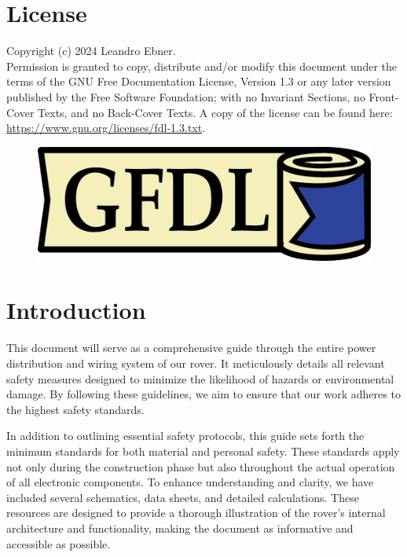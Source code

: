 \section{License}

    Copyright (c)  2024 Leandro Ebner. \\
    Permission is granted to copy, distribute and/or modify this document under the terms of the GNU Free Documentation License, Version 1.3 or any later version published by the Free Software Foundation; with no Invariant Sections, no Front-Cover Texts, and no Back-Cover Texts. A copy of the license can be found here:
    \href{https://www.gnu.org/licenses/fdl-1.3.txt}{https://www.gnu.org/licenses/fdl-1.3.txt}.

    \begin{figure}[h!]
    \includegraphics{contents/figures/gfdl-logo.png}
    \end{figure}
    
\section{Introduction}

    This document will serve as a comprehensive guide through the entire power distribution and wiring system of our rover. It meticulously details all relevant safety measures designed to minimize the likelihood of hazards or environmental damage. By following these guidelines, we aim to ensure that our work adheres to the highest safety standards. 

    \vspace{5mm}

    In addition to outlining essential safety protocols, this guide sets forth the minimum standards for both material and personal safety. These standards apply not only during the construction phase but also throughout the actual operation of all electronic components. To enhance understanding and clarity, we have included several schematics, data sheets, and detailed calculations. These resources are designed to provide a thorough illustration of the rover's internal architecture and functionality, making the document as informative and accessible as possible.

